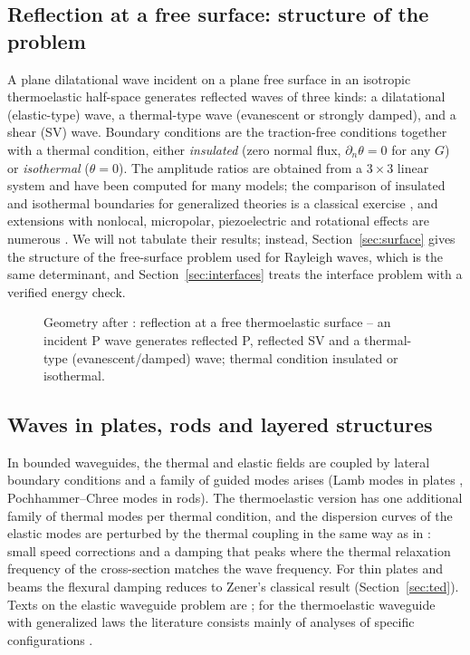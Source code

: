 \subsection{Reflection at a free surface: structure of the problem}
A plane dilatational wave incident on a plane free surface in an isotropic thermoelastic half-space generates reflected waves of three kinds: a dilatational (elastic-type) wave, a thermal-type wave (evanescent or strongly damped), and a shear (SV) wave. Boundary conditions are the traction-free conditions together with a thermal condition, either \emph{insulated} (zero normal flux, $\partial_n\theta=0$ for any $G$) or \emph{isothermal} ($\theta=0$). The amplitude ratios are obtained from a $3\times3$ linear system and have been computed for many models; the comparison of insulated and isothermal boundaries for generalized theories is a classical exercise \citep{Das2008}, and extensions with nonlocal, micropolar, piezoelectric and rotational effects are numerous \citep{Kalkal2020,Singh2020b,Yadav2023,Gupta2024a}. We will not tabulate their results; instead, Section~\ref{sec:surface} gives the structure of the free-surface problem used for Rayleigh waves, which is the same determinant, and Section~\ref{sec:interfaces} treats the interface problem with a verified energy check.

\begin{figure}[t!]\centering\small

\caption{Geometry after \citep{Das2008}: reflection at a free thermoelastic surface -- an incident P wave generates reflected P, reflected SV and a thermal-type (evanescent/damped) wave; thermal condition insulated or isothermal.}\label{fig:reflection-geo}
\end{figure}

\subsection{Waves in plates, rods and layered structures}
In bounded waveguides, the thermal and elastic fields are coupled by lateral boundary conditions and a family of guided modes arises (Lamb modes in plates \citep{Lamb1917}, Pochhammer--Chree modes in rods). The thermoelastic version has one additional family of thermal modes per thermal condition, and the dispersion curves of the elastic modes are perturbed by the thermal coupling in the same way as in : small speed corrections and a damping that peaks where the thermal relaxation frequency of the cross-section matches the wave frequency. For thin plates and beams the flexural damping reduces to Zener's classical result (Section~\ref{sec:ted}). Texts on the elastic waveguide problem are \citep{Achenbach1973,Auld1973}; for the thermoelastic waveguide with generalized laws the literature consists mainly of analyses of specific configurations \citep{Biswas2020,Abouelregal2023}.


